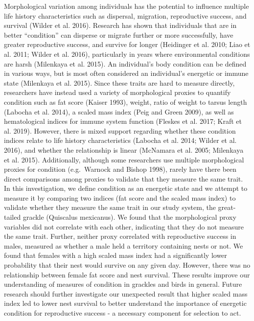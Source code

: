 \documentclass[
]{article}
\begin{document}
Morphological variation among individuals has the potential to influence
multiple life history characteristics such as dispersal, migration,
reproductive success, and survival (Wilder et al. 2016). Research has
shown that individuals that are in better ``condition'' can disperse or
migrate further or more successfully, have greater reproductive success,
and survive for longer (Heidinger et al. 2010; Liao et al. 2011; Wilder
et al. 2016), particularly in years where environmental conditions are
harsh (Milenkaya et al. 2015). An individual's body condition can be
defined in various ways, but is most often considered an individual's
energetic or immune state (Milenkaya et al. 2015). Since these traits
are hard to measure directly, researchers have instead used a variety of
morphological proxies to quantify condition such as fat score (Kaiser
1993), weight, ratio of weight to tarsus length (Labocha et al. 2014), a
scaled mass index (Peig and Green 2009), as well as hematological
indices for immune system function (Fleskes et al. 2017; Kraft et al.
2019). However, there is mixed support regarding whether these condition
indices relate to life history characteristics (Labocha et al. 2014;
Wilder et al. 2016), and whether the relationship is linear (McNamara et
al. 2005; Milenkaya et al. 2015). Additionally, although some
researchers use multiple morphological proxies for condition
(e.g.~Warnock and Bishop 1998), rarely have there been direct
comparisons among proxies to validate that they measure the same trait.
In this investigation, we define condition as an energetic state and we
attempt to measure it by comparing two indices (fat score and the scaled
mass index) to validate whether they measure the same trait in our study
system, the great-tailed grackle (Quiscalus mexicanus). We found that
the morphological proxy variables did not correlate with each other,
indicating that they do not measure the same trait. Further, neither
proxy correlated with reproductive success in males, measured as whether
a male held a territory containing nests or not. We found that females
with a high scaled mass index had a significantly lower probability that
their nest would survive on any given day. However, there was no
relationship between female fat score and nest survival. These results
improve our understanding of measures of condition in grackles and birds
in general. Future research should further investigate our unexpected
result that higher scaled mass index led to lower nest survival to
better understand the importance of energetic condition for reproductive
success - a necessary component for selection to act.
\end{document}
